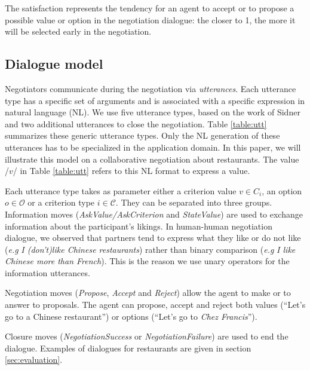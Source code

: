 \documentclass{llncs}
\begin{document}
	\bigskip
	The satisfaction represents the tendency for an agent to accept or to propose a possible value or option in the negotiation dialogue: the closer to 1, the more it will be selected early in the negotiation.
	
	\subsection{Dialogue model}
	Negotiators communicate during the negotiation via \emph{utterances}. Each utterance type has a specific set of arguments and is associated with a specific expression in natural language (NL). We use five utterance types, based on the work of Sidner \cite{sidner1994artificial} and two additional utterances to close the negotiation. Table \ref{table:utt} summarizes these generic utterance types. Only the NL generation of these utterances has to be specialized in the application domain. In this paper, we will illustrate this model on a collaborative negotiation about restaurants. The value /$v$/ in Table \ref{table:utt} refers to this NL format to express a value.
	
	Each utterance type takes as parameter either a criterion value $v \in C_i$, an option $o \in \mathcal{O}$ or a criterion type $i \in \mathcal{C}$. They can be separated into three groups. Information moves (\textit{AskValue/AskCriterion} and \textit{StateValue}) are used to exchange information about the participant's likings. In human-human negotiation dialogue, we observed that partners tend to express what they like or do not like (\emph{e.g} \textit{I (don't)like Chinese restaurants})  rather than binary comparison (\emph{e.g} \textit{I like Chinese more than French}). This is the reason we use unary operators for the information utterances.
	
	Negotiation moves (\textit{Propose}, \textit{Accept} and \textit{Reject}) allow the agent to make or to answer to proposals. The agent can propose, accept and reject both values (``Let's go to a Chinese restaurant'') or options (``Let's go to \emph{Chez Francis}'').
	
	Closure moves (\textit{NegotiationSuccess} or \textit{NegotiationFailure}) are used to end the dialogue.
	Examples of dialogues for restaurants are given in section \ref{sec:evaluation}.
	
\end{document}
